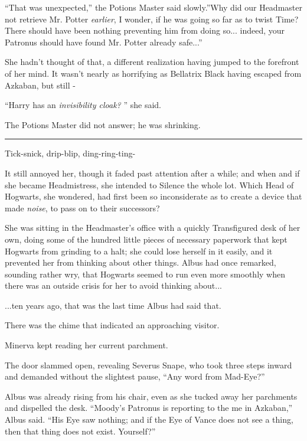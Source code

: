 ``That was unexpected,'' the Potions Master said slowly.''Why did our
Headmaster not retrieve Mr. Potter \emph{earlier}, I wonder, if he was
going so far as to twist Time? There should have been nothing preventing
him from doing so... indeed, your Patronus should have found Mr.
Potter already safe...''

She hadn't thought of that, a different realization having jumped to the
forefront of her mind. It wasn't nearly as horrifying as Bellatrix Black
having escaped from Azkaban, but still -

``Harry has an \emph{invisibility cloak?} '' she said.

The Potions Master did not answer; he was shrinking.

\begin{center}\rule{3in}{0.4pt}\end{center}

Tick-snick, drip-blip, ding-ring-ting-

It still annoyed her, though it faded past attention after a while; and
when and if she became Headmistress, she intended to Silence the whole
lot. Which Head of Hogwarts, she wondered, had first been so
inconsiderate as to create a device that made \emph{noise}, to pass on
to their successors?

She was sitting in the Headmaster's office with a quickly Transfigured
desk of her own, doing some of the hundred little pieces of necessary
paperwork that kept Hogwarts from grinding to a halt; she could lose
herself in it easily, and it prevented her from thinking about other
things. Albus had once remarked, sounding rather wry, that Hogwarts
seemed to run even more smoothly when there was an outside crisis for
her to avoid thinking about...

...ten years ago, that was the last time Albus had said that.

There was the chime that indicated an approaching visitor.

Minerva kept reading her current parchment.

The door slammed open, revealing Severus Snape, who took three steps
inward and demanded without the slightest pause, ``Any word from
Mad-Eye?''

Albus was already rising from his chair, even as she tucked away her
parchments and dispelled the desk. ``Moody's Patronus is reporting to
the me in Azkaban,'' Albus said. ``His Eye saw nothing; and if the Eye
of Vance does not see a thing, then that thing does not exist.
Yourself?''

